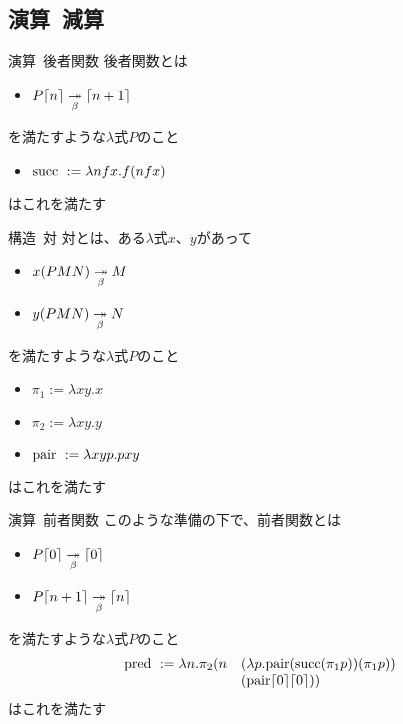 \documentclass[pdflatex,17pt]{beamer}
\begin{document}
\subsection{演算~減算}
\subsectionpage
\begin{frame}{演算~後者関数}
    後者関数とは
    \begin{itemize}
        \item $P\lceil n \rceil \underset{\beta}{\twoheadrightarrow} \lceil n+1 \rceil$
    \end{itemize}
    を満たすような$\lambda$式$P$のこと
    \pause
    \vspace{1em}
    \begin{itemize}
        \item ${\rm succ}~:= \lambda n f x. f (n f x)$
    \end{itemize}
    はこれを満たす
\end{frame}

\begin{frame}{構造~対}
    対とは、ある$\lambda$式$x$、$y$があって
    \begin{itemize}
        \item $x(PMN) \underset{\beta}{\twoheadrightarrow} M$
        \item $y(PMN) \underset{\beta}{\twoheadrightarrow} N$
    \end{itemize}
    を満たすような$\lambda$式$P$のこと
    \pause
    \begin{itemize}
        \item $\pi_1 := \lambda x y. x$
        \item $\pi_2 := \lambda x y. y$
        \item ${\rm pair}~:= \lambda x y p. p x y$
    \end{itemize}
    はこれを満たす
\end{frame}

\begin{frame}{演算~前者関数}
    このような準備の下で、前者関数とは
    \begin{itemize}
        \item $P\lceil 0 \rceil \underset{\beta}{\twoheadrightarrow} \lceil 0 \rceil$
        \item $P\lceil n+1 \rceil \underset{\beta}{\twoheadrightarrow} \lceil n \rceil$
    \end{itemize}
    を満たすような$\lambda$式$P$のこと
    \pause
    $$ \begin{array}{rl}
    {\rm pred}~:= \lambda n. \pi_2 (n & (\lambda p. {\rm pair} ({\rm succ} (\pi_1 p)) (\pi_1 p)) \\
                                      & ({\rm pair} \lceil 0 \rceil \lceil 0 \rceil))
    \end{array} $$
    はこれを満たす
\end{frame}
\end{document}
